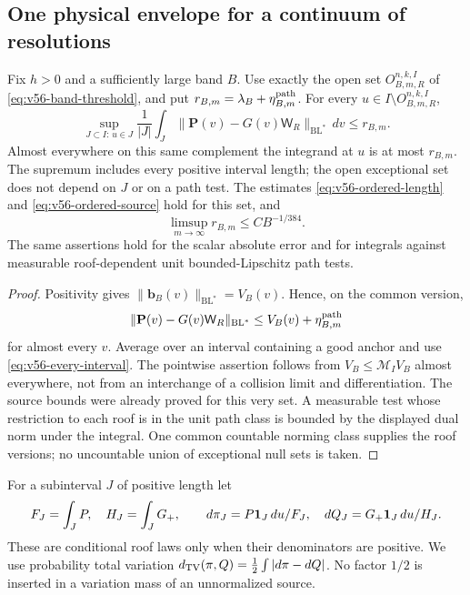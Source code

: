 \subsection{One physical envelope for a continuum of resolutions}
\begin{theorem}
\label{thm:v56-all-resolutions}
Fix $h>0$ and a sufficiently large band $B$. Use exactly the open
set $O_{B,m,R}^{n,k,I}$ of \eqref{eq:v56-band-threshold}, and put
$r_{B,m}=\lambda_B+\eta^{\rm path}_{B,m}$.
For every $u\in I\setminus O_{B,m,R}^{n,k,I}$,
\begin{equation}\label{eq:v56-all-resolution-path}
 \sup_{J\subset I:\,u\in J}\frac1{|J|}\int_J
       \|\mathbf P(v)-G(v)\mathsf W_R\|_{\mathrm{BL}^*}\,dv
                                                    \le r_{B,m}.
\end{equation}
Almost everywhere on this same complement the integrand at $u$
is at most $r_{B,m}$. The supremum includes every positive interval
length; the open exceptional set does not depend on $J$ or on a
path test. The estimates \eqref{eq:v56-ordered-length} and
\eqref{eq:v56-ordered-source} hold for this set, and
\[
 \limsup_{m\to\infty}r_{B,m}\le CB^{-1/384}.
\]
The same assertions hold for the scalar absolute error and for
integrals against measurable roof-dependent unit bounded-Lipschitz
path tests.
\end{theorem}
\begin{proof}
Positivity gives $\|\mathbf b_B(v)\|_{\mathrm{BL}^*}=V_B(v)$.
Hence, on the common version,
\[
 \|\mathbf P(v)-G(v)\mathsf W_R\|_{\mathrm{BL}^*}
                    \le V_B(v)+\eta^{\rm path}_{B,m}
\]
for almost every $v$. Average over an interval containing a good
anchor and use \eqref{eq:v56-every-interval}. The pointwise assertion
follows from $V_B\le\mathcal M_I V_B$ almost everywhere, not from
an interchange of a collision limit and differentiation. The source
bounds were already proved for this very set. A measurable test
whose restriction to each roof is in the unit path class is bounded
by the displayed dual norm under the integral. One common countable
norming class supplies the roof versions; no uncountable union of
exceptional null sets is taken.
\end{proof}

For a subinterval $J$ of positive length let
\begin{equation}\label{eq:v56-interval-posteriors}
 F_J=\int_JP,\quad H_J=\int_JG_+,\qquad
 d\pi_J=P\one_J\,du/F_J,\quad
 dQ_J=G_+\one_J\,du/H_J.
\end{equation}
These are conditional roof laws only when their denominators are
positive. We use probability total variation
$d_{\rm TV}(\pi,Q)=\tfrac12\int|d\pi-dQ|$.
No factor $1/2$ is inserted in a variation mass of an unnormalized
source.

